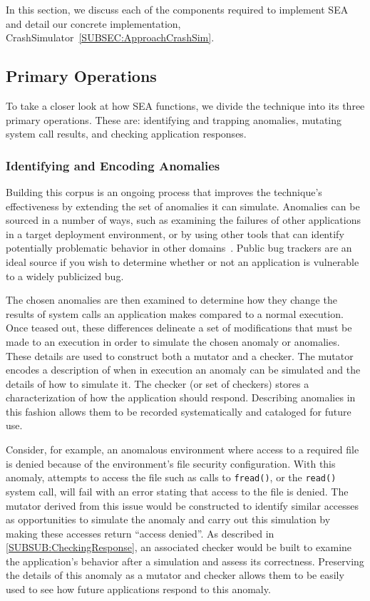 In this section, we discuss each of the components
required to implement SEA
and detail our concrete implementation,
CrashSimulator~\ref{SUBSEC:ApproachCrashSim}.

\subsection{Primary Operations}
\label{SEC:PrimaryOperations}

To take a closer look at how SEA functions,
we divide the technique
into its three primary operations.
These are:
identifying and trapping anomalies,
mutating system call results,
and checking application responses.

\subsubsection{Identifying and Encoding Anomalies}
\label{SUBSUB:IdentifyingAndEncoding}
Building this corpus is an ongoing process that improves the technique's
effectiveness by extending the set of anomalies it can simulate.
Anomalies can be sourced
in a number of ways,
such as
examining the failures of other applications
in a target deployment environment,
or by using other tools that can identify
potentially problematic behavior in other domains~\cite{Zhuang_NSDI_2014,
rasley2015detecting}.
Public bug trackers are an ideal source
if you wish to determine
whether or not an application
is vulnerable to a widely publicized bug.

The chosen anomalies are then examined
to determine how they change the results
of system calls an application makes
compared to a normal execution.
Once teased out,
these differences delineate
a set of modifications
that must be made to an execution
in order to simulate the chosen anomaly or anomalies.
These details are used to
construct both a mutator and a checker.
The mutator encodes
a description of when in execution an anomaly can be simulated
and the details of how to simulate it.
The checker
(or set of checkers)
stores a characterization of
how the application should respond.
Describing anomalies in this fashion
allows them to be recorded systematically and cataloged for future use.

Consider,
for example,
an anomalous environment
where access to a required file is denied because of
the environment's file security configuration.
With this anomaly,
attempts to access the file
such as calls to {\tt fread()},
or the {\tt read()} system call,
will fail with an error stating that access to the file is denied.
The mutator derived from this issue would be constructed to
identify similar accesses as opportunities
to simulate the anomaly
and carry out this simulation
by making these
accesses return ``access denied''.
As described in \ref{SUBSUB:CheckingResponse},
an associated checker would be built to
examine the application's behavior after a simulation and assess its
correctness.
Preserving the details of this anomaly
as a mutator and checker
allows them to be
easily used
to see how future applications
respond to this anomaly.

